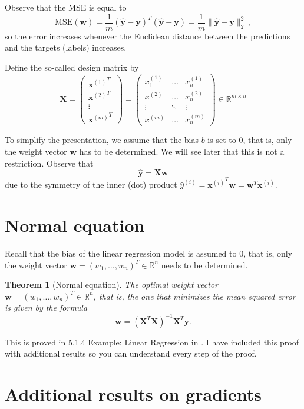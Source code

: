\documentclass[12pt]{article}
\newtheorem{thm}{Theorem}
\newcommand{\R}{\mathbb{R}}
\newcommand{\x}{\boldsymbol{x}}
\newcommand{\X}{\boldsymbol{X}}
\newcommand{\y}{\boldsymbol{y}}
\newcommand{\yh}{\hat{\boldsymbol{y}}}
\newcommand{\w}{\boldsymbol{w}}
\newcommand{\mse}{\mathrm{MSE}}
\begin{document}
Observe that the MSE is equal to
\[
\mse (\w) 
= \frac{1}{m} (\yh - \y)^T (\yh - \y) =
\frac{1}{m} \| \yh - \y \|^2_2\,,
\]
so the error increases whenever the Euclidean distance between the predictions and the targets (labels) increases. 

Define the so-called design matrix by
\[
\X = 
\left(
\begin{array}{c}
{\x^{(1)}}^T \\
{\x^{(2)}}^T \\
\vdots \\
{\x^{(m)}}^T 
\end{array}
\right)
=
\left(
\begin{array}{ccc}
    x^{(1)}_1 & \ldots & x^{(1)}_n \\
    x^{(2)} & \ldots & x^{(2)}_n \\
    \vdots   & \ddots & \vdots \\
    x^{(m)} & \ldots & x^{(m)}_n
\end{array}
\right) \in \R^{m \times n}
\]

To simplify the presentation, we assume that the bias $b$ is set to $0$, that is, only the weight vector $\w$ has to be determined. We will see later that this is not a restriction.
Observe that
\[
\hat{\y} = \X \w
\]
due to the symmetry of the inner (dot) product $\hat{y}^{(i)} = {\x^{(i)}}^T \w = \w^T \x^{(i)}$.

%
%
%

\section{Normal equation}

Recall that the bias of the linear regression model is assumed to $0$, that is, only the weight vector $\w=(w_1,\ldots,w_n)^T\in\R^n$ needs to be determined.

\begin{thm}[Normal equation]
The optimal weight vector $\w=(w_1,\ldots,w_n)^T\in\R^n$, that is, the one that minimizes the mean squared error is given by the formula
\[
\w = (\X^T \X)^{-1} \X^T \y. 
\]
\end{thm}
This is proved in 5.1.4 Example: Linear Regression in \cite{DL}. I have included this proof with additional results so you can understand every step of the proof. 

\section{Additional results on gradients}
\end{document}
